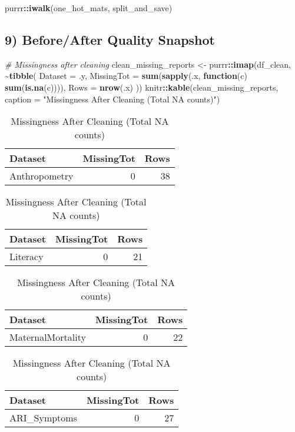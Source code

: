 \documentclass[
]{article}
\newenvironment{Shaded}{\begin{snugshade}}{\end{snugshade}}
\newcommand{\AttributeTok}[1]{\textcolor[rgb]{0.13,0.29,0.53}{#1}}
\newcommand{\CommentTok}[1]{\textcolor[rgb]{0.56,0.35,0.01}{\textit{#1}}}
\newcommand{\ControlFlowTok}[1]{\textcolor[rgb]{0.13,0.29,0.53}{\textbf{#1}}}
\newcommand{\FunctionTok}[1]{\textcolor[rgb]{0.13,0.29,0.53}{\textbf{#1}}}
\newcommand{\NormalTok}[1]{#1}
\newcommand{\OtherTok}[1]{\textcolor[rgb]{0.56,0.35,0.01}{#1}}
\newcommand{\SpecialCharTok}[1]{\textcolor[rgb]{0.81,0.36,0.00}{\textbf{#1}}}
\newcommand{\StringTok}[1]{\textcolor[rgb]{0.31,0.60,0.02}{#1}}
\begin{document}
\begin{Shaded}
\begin{Highlighting}[]
\NormalTok{purrr}\SpecialCharTok{::}\FunctionTok{iwalk}\NormalTok{(one\_hot\_mats, split\_and\_save)}
\end{Highlighting}
\end{Shaded}

\subsection{9) Before/After Quality
Snapshot}\label{beforeafter-quality-snapshot}

\begin{Shaded}
\begin{Highlighting}[]
\CommentTok{\# Missingness after cleaning}
\NormalTok{clean\_missing\_reports }\OtherTok{\textless{}{-}}\NormalTok{ purrr}\SpecialCharTok{::}\FunctionTok{imap}\NormalTok{(df\_clean, }\SpecialCharTok{\textasciitilde{}}\FunctionTok{tibble}\NormalTok{(}
  \AttributeTok{Dataset    =}\NormalTok{ .y,}
  \AttributeTok{MissingTot =} \FunctionTok{sum}\NormalTok{(}\FunctionTok{sapply}\NormalTok{(.x, }\ControlFlowTok{function}\NormalTok{(c) }\FunctionTok{sum}\NormalTok{(}\FunctionTok{is.na}\NormalTok{(c)))),}
  \AttributeTok{Rows       =} \FunctionTok{nrow}\NormalTok{(.x)}
\NormalTok{))}
\NormalTok{knitr}\SpecialCharTok{::}\FunctionTok{kable}\NormalTok{(clean\_missing\_reports, }\AttributeTok{caption =} \StringTok{"Missingness After Cleaning (Total NA counts)"}\NormalTok{)}
\end{Highlighting}
\end{Shaded}

\begin{table}
\caption{\label{tab:quality-snapshot}Missingness After Cleaning (Total NA counts)}

\centering
\begin{tabular}[t]{l|r|r}
\hline
Dataset & MissingTot & Rows\\
\hline
Anthropometry & 0 & 38\\
\hline
\end{tabular}
\centering
\begin{tabular}[t]{l|r|r}
\hline
Dataset & MissingTot & Rows\\
\hline
Literacy & 0 & 21\\
\hline
\end{tabular}
\centering
\begin{tabular}[t]{l|r|r}
\hline
Dataset & MissingTot & Rows\\
\hline
MaternalMortality & 0 & 22\\
\hline
\end{tabular}
\centering
\begin{tabular}[t]{l|r|r}
\hline
Dataset & MissingTot & Rows\\
\hline
ARI\_Symptoms & 0 & 27\\
\hline
\end{tabular}
\end{table}
\end{document}

